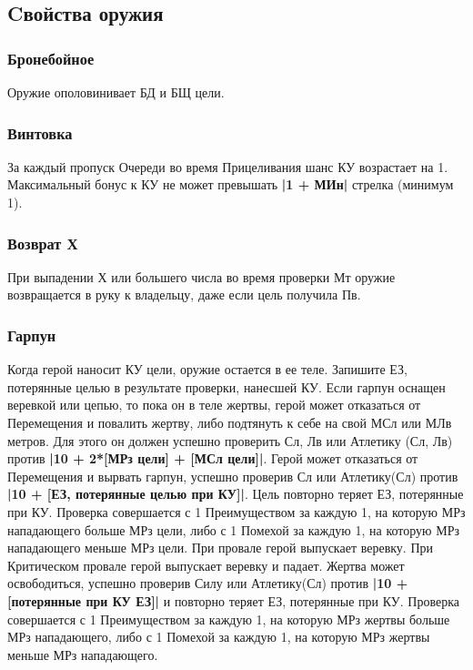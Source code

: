 \subsection{Cвойства оружия}
\subsubsection{Бронебойное} Оружие ополовинивает БД и БЩ цели.
\subsubsection{Винтовка} За каждый пропуск Очереди во время Прицеливания шанс КУ возрастает на 1. Максимальный бонус к КУ не может превышать \textbf{|1 + МИн|} стрелка (минимум 1).
\subsubsection{Возврат Х} При выпадении Х или большего числа во время проверки Мт оружие возвращается в руку к владельцу, даже если цель получила Пв.
\subsubsection{Гарпун} Когда герой наносит КУ цели, оружие остается в ее теле. Запишите ЕЗ, потерянные целью в результате проверки, нанесшей КУ. 
\newline Если гарпун оснащен веревкой или цепью, то пока он в теле жертвы, герой может отказаться от Перемещения и повалить жертву, либо подтянуть к себе на свой МСл или МЛв метров.  Для этого он должен успешно проверить Сл, Лв или Атлетику (Сл, Лв) против \textbf{|10 + 2*[МРз цели] + [МСл цели]|}.  
\newline Герой может отказаться от Перемещения  и вырвать гарпун, успешно проверив Сл или Атлетику(Сл) против \textbf{|10 + [ЕЗ, потерянные целью при КУ]|}. Цель повторно теряет ЕЗ, потерянные при КУ. 
\newline Проверка совершается с 1 Преимуществом за каждую 1, на которую МРз нападающего больше МРз цели, либо с 1 Помехой за каждую 1, на которую МРз нападающего меньше МРз цели. 
\newline При провале герой выпускает веревку. При Критическом провале герой выпускает веревку и падает. 
\newline Жертва может освободиться, успешно проверив Силу или Атлетику(Сл) против \textbf{|10 + [потерянные при КУ ЕЗ]|} и повторно теряет ЕЗ, потерянные при КУ.  
\newline Проверка совершается с 1 Преимуществом за каждую 1, на которую МРз жертвы больше МРз нападающего, либо с 1 Помехой за каждую 1, на которую МРз жертвы меньше МРз нападающего.
